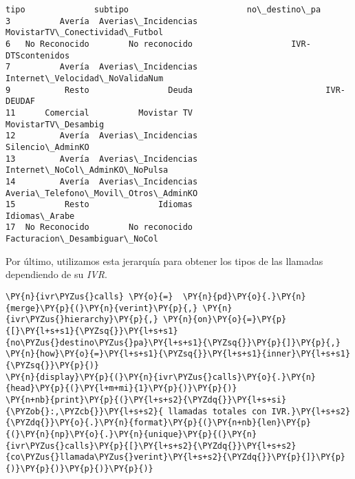             \begin{tcolorbox}[breakable, size=fbox, boxrule=.5pt, pad at break*=1mm, opacityfill=0]
\begin{Verbatim}[commandchars=\\\{\}]
             tipo              subtipo                        no\_destino\_pa
3          Avería  Averias\_Incidencias       MovistarTV\_Conectividad\_Futbol
6   No Reconocido        No reconocido                    IVR-DTScontenidos
7          Avería  Averias\_Incidencias       Internet\_Velocidad\_NoValidaNum
9           Resto                Deuda                           IVR-DEUDAF
11      Comercial          Movistar TV                  MovistarTV\_Desambig
12         Avería  Averias\_Incidencias                     Silencio\_AdminKO
13         Avería  Averias\_Incidencias       Internet\_NoCol\_AdminKO\_NoPulsa
14         Avería  Averias\_Incidencias  Averia\_Telefono\_Movil\_Otros\_AdminKO
15          Resto              Idiomas                        Idiomas\_Arabe
17  No Reconocido        No reconocido        Facturacion\_Desambiguar\_NoCol
\end{Verbatim}
\end{tcolorbox}
        
    Por último, utilizamos esta jerarquía para obtener los tipos de las
llamadas dependiendo de su \textit{IVR}.
\vspace{0.5cm}

    \begin{tcolorbox}[breakable, size=fbox, boxrule=1pt, pad at break*=1mm,colback=cellbackground, colframe=cellborder]
\begin{Verbatim}[commandchars=\\\{\}]
\PY{n}{ivr\PYZus{}calls} \PY{o}{=}  \PY{n}{pd}\PY{o}{.}\PY{n}{merge}\PY{p}{(}\PY{n}{verint}\PY{p}{,} \PY{n}{ivr\PYZus{}hierarchy}\PY{p}{,} \PY{n}{on}\PY{o}{=}\PY{p}{[}\PY{l+s+s1}{\PYZsq{}}\PY{l+s+s1}{no\PYZus{}destino\PYZus{}pa}\PY{l+s+s1}{\PYZsq{}}\PY{p}{]}\PY{p}{,} \PY{n}{how}\PY{o}{=}\PY{l+s+s1}{\PYZsq{}}\PY{l+s+s1}{inner}\PY{l+s+s1}{\PYZsq{}}\PY{p}{)}
\PY{n}{display}\PY{p}{(}\PY{n}{ivr\PYZus{}calls}\PY{o}{.}\PY{n}{head}\PY{p}{(}\PY{l+m+mi}{1}\PY{p}{)}\PY{p}{)}
\PY{n+nb}{print}\PY{p}{(}\PY{l+s+s2}{\PYZdq{}}\PY{l+s+si}{\PYZob{}:,\PYZcb{}}\PY{l+s+s2}{ llamadas totales con IVR.}\PY{l+s+s2}{\PYZdq{}}\PY{o}{.}\PY{n}{format}\PY{p}{(}\PY{n+nb}{len}\PY{p}{(}\PY{n}{np}\PY{o}{.}\PY{n}{unique}\PY{p}{(}\PY{n}{ivr\PYZus{}calls}\PY{p}{[}\PY{l+s+s2}{\PYZdq{}}\PY{l+s+s2}{co\PYZus{}llamada\PYZus{}verint}\PY{l+s+s2}{\PYZdq{}}\PY{p}{]}\PY{p}{)}\PY{p}{)}\PY{p}{)}\PY{p}{)}
\end{Verbatim}
\end{tcolorbox}

